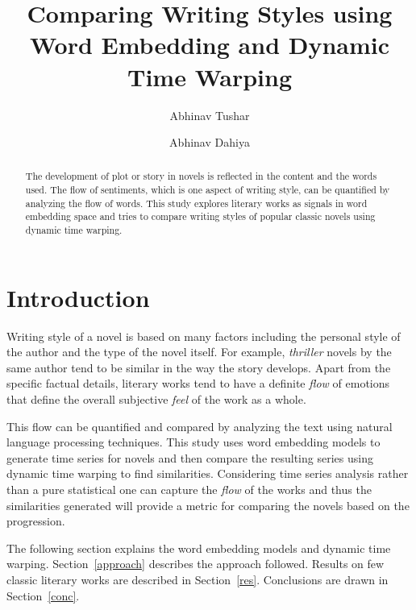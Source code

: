 \documentclass[%
 aip,
rsi,%
 amsmath,amssymb,
 reprint,%
author-year,
groupedaddress
]{revtex4-1}
\begin{document}
\title[Comparing Writing Styles using Word Embedding and Dynamic Time Warping]{Comparing Writing Styles using\\ Word Embedding and Dynamic Time Warping}

\author{Abhinav Tushar}
\author{Abhinav Dahiya}

\begin{abstract}
The development of plot or story in novels is reflected in the content and the words used. The flow of sentiments, which is one aspect of writing style, can be quantified by analyzing the flow of words. This study explores literary works as signals in word embedding space and tries to compare writing styles of popular classic novels using dynamic time warping.
\end{abstract}

\maketitle

\section{\label{intro}Introduction}
Writing style of a novel is based on many factors including the personal style of the author and the type of the novel itself. For example, {\sl thriller} novels by the same author tend to be similar in the way the story develops. Apart from the specific factual details, literary works tend to have a definite {\sl flow} of emotions that define the overall subjective {\sl feel} of the work as a whole.

This flow can be quantified and compared by analyzing the text using natural language processing techniques. This study uses word embedding models to generate time series for novels and then compare the resulting series using dynamic time warping to find similarities. Considering time series analysis rather than a pure statistical one can capture the {\sl flow} of the works and thus the similarities generated will provide a metric for comparing the novels based on the progression.

The following section explains the word embedding models and dynamic time warping. Section~\ref{approach} describes the approach followed. Results on few classic literary works are described in Section~\ref{res}. Conclusions are drawn in Section~\ref{conc}.
\end{document}
